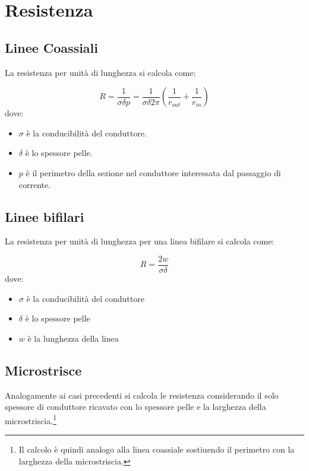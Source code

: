 \documentclass[10pt,a4paper]{report}
\begin{document}
	\section{Resistenza}

		\subsection{Linee Coassiali}

			La resistenza per unità di lunghezza si calcola come:

			\begin{equation}R=\frac{1}{\sigma \delta p}=\frac{1}{\sigma \delta 2 \pi}(\frac{1}{r_{out}}+\frac{1}{r_{in}})\end{equation}
			dove:
			
			\begin{itemize}
			\item $\sigma$ è la conducibilità del conduttore.
			\item $\delta$ è lo spessore pelle.
			\item $p$ è il perimetro della sezione nel conduttore interessata dal passaggio di corrente.
			\end{itemize}

		\subsection{Linee bifilari}

				La resistenza per unità di lunghezza per una linea bifilare si calcola come:

				\begin{equation}R=\frac{2w}{\sigma \delta}\end{equation}
				dove:
				
				\begin{itemize}
				\item $\sigma$ è la conducibilità del conduttore
				\item $\delta$ è lo spessore pelle
				\item $w$ è la lunghezza della linea
				\end{itemize}

		\subsection{Microstrisce}

			Analogamente ai casi precedenti si calcola le resistenza considerando il solo spessore di conduttore ricavato con lo spessore pelle e la larghezza della microstriscia.\footnote{Il calcolo è quindi analogo alla linea coassiale sostiuendo il perimetro con la larghezza della microstriscia.}
\end{document}
